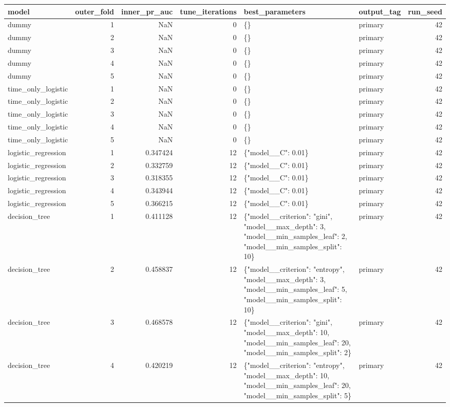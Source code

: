\begin{tabular}{lrrrllr}
\toprule
model & outer\_fold & inner\_pr\_auc & tune\_iterations & best\_parameters & output\_tag & run\_seed \\
\midrule
dummy & 1 & NaN & 0 & \{\} & primary & 42 \\
dummy & 2 & NaN & 0 & \{\} & primary & 42 \\
dummy & 3 & NaN & 0 & \{\} & primary & 42 \\
dummy & 4 & NaN & 0 & \{\} & primary & 42 \\
dummy & 5 & NaN & 0 & \{\} & primary & 42 \\
time\_only\_logistic & 1 & NaN & 0 & \{\} & primary & 42 \\
time\_only\_logistic & 2 & NaN & 0 & \{\} & primary & 42 \\
time\_only\_logistic & 3 & NaN & 0 & \{\} & primary & 42 \\
time\_only\_logistic & 4 & NaN & 0 & \{\} & primary & 42 \\
time\_only\_logistic & 5 & NaN & 0 & \{\} & primary & 42 \\
logistic\_regression & 1 & 0.347424 & 12 & \{"model\_\_C": 0.01\} & primary & 42 \\
logistic\_regression & 2 & 0.332759 & 12 & \{"model\_\_C": 0.01\} & primary & 42 \\
logistic\_regression & 3 & 0.318355 & 12 & \{"model\_\_C": 0.01\} & primary & 42 \\
logistic\_regression & 4 & 0.343944 & 12 & \{"model\_\_C": 0.01\} & primary & 42 \\
logistic\_regression & 5 & 0.366215 & 12 & \{"model\_\_C": 0.01\} & primary & 42 \\
decision\_tree & 1 & 0.411128 & 12 & \{"model\_\_criterion": "gini", "model\_\_max\_depth": 3, "model\_\_min\_samples\_leaf": 2, "model\_\_min\_samples\_split": 10\} & primary & 42 \\
decision\_tree & 2 & 0.458837 & 12 & \{"model\_\_criterion": "entropy", "model\_\_max\_depth": 3, "model\_\_min\_samples\_leaf": 5, "model\_\_min\_samples\_split": 10\} & primary & 42 \\
decision\_tree & 3 & 0.468578 & 12 & \{"model\_\_criterion": "gini", "model\_\_max\_depth": 10, "model\_\_min\_samples\_leaf": 20, "model\_\_min\_samples\_split": 2\} & primary & 42 \\
decision\_tree & 4 & 0.420219 & 12 & \{"model\_\_criterion": "entropy", "model\_\_max\_depth": 10, "model\_\_min\_samples\_leaf": 20, "model\_\_min\_samples\_split": 5\} & primary & 42 \\

\end{tabular}
